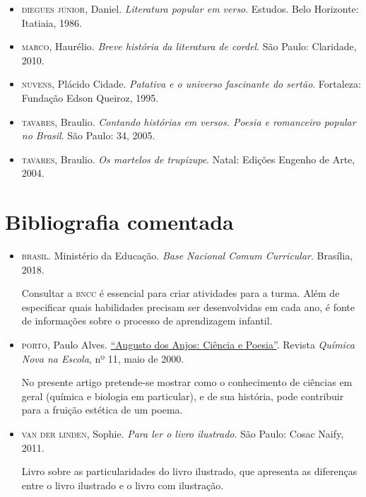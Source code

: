 \documentclass[11pt]{extarticle}
\begin{document}
\begin{itemize}
	
\item \textsc{diegues júnior}, Daniel. \textit{Literatura popular em verso}. Estudos. Belo Horizonte: Itatiaia, 1986. 

\item \textsc{marco}, Haurélio. \textit{Breve história da literatura de cordel}. São Paulo: Claridade, 2010.

\item \textsc{nuvens}, Plácido Cidade. \textit{Patativa e o universo fascinante
do sertão}. Fortaleza: Fundação Edson Queiroz, 1995.

\item \textsc{tavares}, Braulio. \textit{Contando histórias em versos. Poesia e romanceiro popular no Brasil}. São Paulo: 34, 2005.

\item \textsc{tavares}, Braulio. \textit{Os martelos de trupizupe}. Natal: Edições Engenho de Arte, 2004.
\end{itemize}

\section{Bibliografia comentada}

\begin{itemize}
\item \textsc{brasil}. Ministério da Educação. \textit{Base Nacional Comum Curricular}. Brasília, 2018.

Consultar a \textsc{bncc} é essencial para criar atividades para a turma. Além de especificar 
quais habilidades precisam ser desenvolvidas em cada ano, é fonte de informações sobre 
o processo de aprendizagem infantil. 

 \item \textsc{porto}, Paulo Alves. \href{http://qnesc.sbq.org.br/online/qnesc11/v11a07.pdf}{``Augusto dos 
 	Anjos: Ciência e Poesia''}. Revista \textit{Química Nova na Escola},
	nº 11, maio de 2000.  

No presente artigo pretende-se mostrar como o conhecimento de ciências em geral (química e biologia em
particular), e de sua história, pode contribuir para a fruição estética de um poema.


\item \textsc{van der linden}, Sophie. \textit{Para ler o livro ilustrado}. São Paulo: Cosac Naify, 2011.

Livro sobre as particularidades do livro ilustrado, que apresenta as diferenças entre o livro ilustrado e o livro com ilustração. 
\end{itemize}
\end{document}
